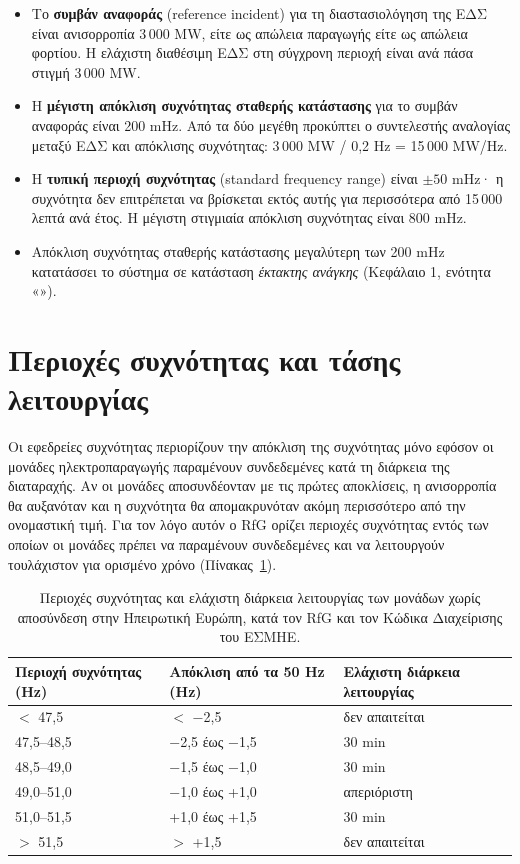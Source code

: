 \begin{itemize}
\item Το \textbf{συμβάν αναφοράς} (reference incident) για τη διαστασιολόγηση της ΕΔΣ είναι
      ανισορροπία 3\,000 MW, είτε ως απώλεια παραγωγής είτε ως απώλεια φορτίου. Η ελάχιστη
      διαθέσιμη ΕΔΣ στη σύγχρονη περιοχή είναι ανά πάσα στιγμή 3\,000 MW.
\item Η \textbf{μέγιστη απόκλιση συχνότητας σταθερής κατάστασης} για το συμβάν αναφοράς
      είναι 200 mHz. Από τα δύο μεγέθη προκύπτει ο συντελεστής αναλογίας μεταξύ ΕΔΣ και
      απόκλισης συχνότητας: 3\,000 MW / 0,2 Hz = 15\,000 MW/Hz.
\item Η \textbf{τυπική περιοχή συχνότητας} (standard frequency range) είναι $\pm 50$ mHz· η
      συχνότητα δεν επιτρέπεται να βρίσκεται εκτός αυτής για περισσότερα από
      15\,000 λεπτά ανά έτος. Η μέγιστη στιγμιαία απόκλιση συχνότητας είναι 800 mHz.
\item Απόκλιση συχνότητας σταθερής κατάστασης μεγαλύτερη των 200 mHz κατατάσσει το σύστημα
      σε κατάσταση \emph{έκτακτης ανάγκης} (Κεφάλαιο 1, ενότητα
      «»).
\end{itemize}

\section{Περιοχές συχνότητας και τάσης λειτουργίας}
\label{sec:f-ranges}

Οι εφεδρείες συχνότητας περιορίζουν την απόκλιση της συχνότητας μόνο εφόσον οι μονάδες
ηλεκτροπαραγωγής παραμένουν συνδεδεμένες κατά τη διάρκεια της διαταραχής. Αν οι μονάδες
αποσυνδέονταν με τις πρώτες αποκλίσεις, η ανισορροπία θα αυξανόταν και η συχνότητα θα
απομακρυνόταν ακόμη περισσότερο από την ονομαστική τιμή. Για τον λόγο αυτόν ο RfG ορίζει περιοχές συχνότητας εντός των οποίων οι μονάδες πρέπει να παραμένουν
συνδεδεμένες και να λειτουργούν τουλάχιστον για ορισμένο χρόνο (Πίνακας~\ref{tab:f-ranges}).

\begin{table}[!htbp]
\centering
\begin{tabular}{lll}
\hline
\textbf{Περιοχή συχνότητας (Hz)} & \textbf{Απόκλιση από τα 50 Hz (Hz)}
& \textbf{Ελάχιστη διάρκεια λειτουργίας} \\
\hline
$<$ 47,5 & $<$ −2,5 & δεν απαιτείται \\
47,5--48,5 & −2,5 έως −1,5 & 30 min \\
48,5--49,0 & −1,5 έως −1,0 & 30 min \\
49,0--51,0 & −1,0 έως +1,0 & απεριόριστη \\
51,0--51,5 & +1,0 έως +1,5 & 30 min \\
$>$ 51,5 & $>$ +1,5 & δεν απαιτείται \\
\hline
\end{tabular}
\caption{Περιοχές συχνότητας και ελάχιστη διάρκεια λειτουργίας των μονάδων χωρίς αποσύνδεση
στην Ηπειρωτική Ευρώπη, κατά τον RfG και τον Κώδικα Διαχείρισης του ΕΣΜΗΕ.}
\label{tab:f-ranges}
\end{table}

